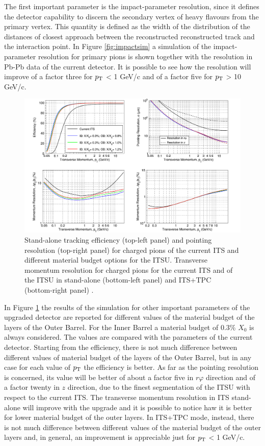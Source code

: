 %
The first important parameter is the impact-parameter resolution, since it defines the detector capability to discern the secondary vertex of heavy flavours from the primary vertex. This quantity is defined as the width of the distribution of the distances of closest approach between the reconstructed reconstructed track and the interaction point. In Figure \ref{fig:impactsim} a simulation of the impact-parameter resolution for primary pions is shown together with the resolution in Pb-Pb data of the current detector. It is possible to see how the resolution will improve of a factor three for $p_\text{T}$ < 1 GeV/c and of a factor five for $p_\text{T}$ > 10 GeV/c.\\
%
\begin{figure}
  \centering
  \includegraphics[scale=0.4]{figures/upperf.png}
  \caption{Stand-alone tracking efficiency (top-left panel) and pointing resolution (top-right panel) for charged pions of the current ITS and different material budget options for the ITSU. Transverse momentum resolution for charged pions for the current ITS and of the ITSU in stand-alone (bottom-left panel) and ITS+TPC (bottom-right panel) \cite{uptdr}.}
  \label{fig:upperf}
\end{figure}
%
In Figure \ref{fig:upperf} the results of the simulation for other important parameters of the upgraded detector are reported for different values of the material budget of the layers of the Outer Barrel. For the Inner Barrel a material budget of 0.3\% $X_0$ is always considered. The values are compared with the parameters of the current detector. Starting from the efficiency, there is not much difference between different values of material budget of the layers of the Outer Barrel, but in any case for each value of $p_\text{T}$ the efficiency is better. As far as the pointing resolution is concerned, its value will be better of about a factor five in $r\varphi$ direction and of a factor twenty in $z$ direction, due to the finest segmentation of the ITSU with respect to the current ITS.  The transverse momentum resolution in ITS stand-alone will improve with the upgrade and it is possible to notice haw it is better for lower material budget of the outer layers. In ITS+TPC mode, instead, there is not much difference between different values of the material budget of the outer layers and, in general, an improvement is appreciable just for $p_\text{T}$ < 1 GeV/c.
